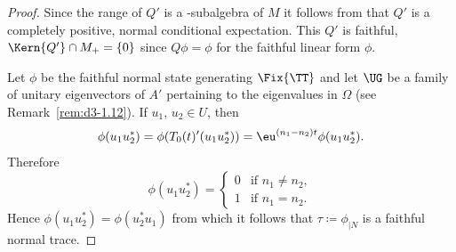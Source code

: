 \begin{proof}
Since the range of\/ $Q'$ is a \WA-subalgebra of\/ $M$ it follows from \textcite[Theorem III.3.4]{takesaki:1979} that $Q'$ is a completely positive, normal conditional expectation.
This $Q'$ is faithful, \ie $\Kern{Q'} \cap M_{+} = \{0\}$ since $Q\phi = \phi$ for the faithful linear form $\phi$.

Let $\phi$ be the faithful normal state generating $\Fix{\TT}$ and let $\UG$ be a family of unitary eigenvectors of\/ $A'$ pertaining to the eigenvalues in $\Omega$ (see Remark~\ref{rem:d3-1.12}).
If\/ $u_{1}$, $u_{2} \in U$, then
\[
\phi(u_{1}u_{2}^{*}) = \phi(T_{0}(t)'(u_{1}u_{2}^{*})) = \eu^{(n_{1}-n_{2})t}\phi(u_{1}u_{2}^{*}).
\]
Therefore
\[
\phi(u_{1}u_{2}^{*}) = 
    \begin{cases} 
        0 & \text{if } n_{1} \neq n_{2}, \\ 
        1 & \text{if } n_{1} = n_{2}. 
    \end{cases}
\]
Hence $\phi(u_{1}u_{2}^{*}) = \phi(u_{2}^{*}u_{1})$ from which it follows that $\tau \coloneqq \phi_{\vert N}$ is a faithful normal trace.
\end{proof}
